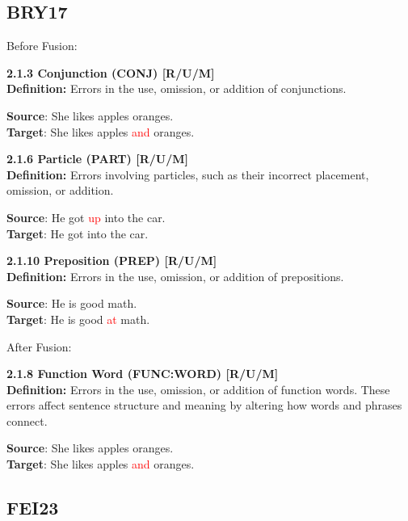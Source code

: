 \subsection{BRY17}
Before Fusion:
\begin{tcolorbox}[breakable]
\noindent \textbf{2.1.3 Conjunction (CONJ) [R/U/M]}\\
\textbf{Definition:} Errors in the use, omission, or addition of conjunctions.


\textbf{Source}: She likes apples oranges. \\
\textbf{Target}: She likes apples \textcolor{red}{and} oranges.

\noindent \textbf{2.1.6 Particle (PART) [R/U/M]}\\
\textbf{Definition:} Errors involving particles, such as their incorrect placement, omission, or addition.


\textbf{Source}: He got \textcolor{red}{up} into the car. \\
\textbf{Target}: He got into the car.

\noindent \textbf{2.1.10 Preposition (PREP) [R/U/M]}\\
\textbf{Definition:} Errors in the use, omission, or addition of prepositions.


\textbf{Source}: He is good math. \\
\textbf{Target}: He is good \textcolor{red}{at} math.

\end{tcolorbox}
\noindent After Fusion:
\begin{tcolorbox}[breakable]
\noindent \textbf{2.1.8 Function Word (FUNC:WORD) [R/U/M]}\\
\textbf{Definition:} Errors in the use, omission, or addition of function words. These errors affect sentence structure and meaning by altering how words and phrases connect.


\textbf{Source}: She likes apples oranges. \\
\textbf{Target}: She likes apples \textcolor{red}{and} oranges.

\end{tcolorbox}

\subsection{FEI23}

